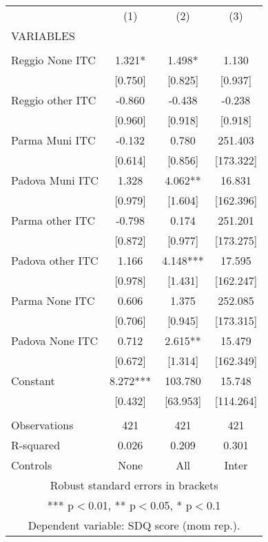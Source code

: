\begin{tabular}{lccc} \hline
 & (1) & (2) & (3) \\
VARIABLES &  &  &  \\ \hline
 &  &  &  \\
Reggio None ITC & 1.321* & 1.498* & 1.130 \\
 & [0.750] & [0.825] & [0.937] \\
Reggio other ITC & -0.860 & -0.438 & -0.238 \\
 & [0.960] & [0.918] & [0.918] \\
Parma Muni ITC & -0.132 & 0.780 & 251.403 \\
 & [0.614] & [0.856] & [173.322] \\
Padova Muni ITC & 1.328 & 4.062** & 16.831 \\
 & [0.979] & [1.604] & [162.396] \\
Parma other ITC & -0.798 & 0.174 & 251.201 \\
 & [0.872] & [0.977] & [173.275] \\
Padova other ITC & 1.166 & 4.148*** & 17.595 \\
 & [0.978] & [1.431] & [162.247] \\
Parma None ITC & 0.606 & 1.375 & 252.085 \\
 & [0.706] & [0.945] & [173.315] \\
Padova None ITC & 0.712 & 2.615** & 15.479 \\
 & [0.672] & [1.314] & [162.349] \\
Constant & 8.272*** & 103.780 & 15.748 \\
 & [0.432] & [63.953] & [114.264] \\
 &  &  &  \\
Observations & 421 & 421 & 421 \\
R-squared & 0.026 & 0.209 & 0.301 \\
 Controls & None & All & Inter \\ \hline
\multicolumn{4}{c}{ Robust standard errors in brackets} \\
\multicolumn{4}{c}{ *** p$<$0.01, ** p$<$0.05, * p$<$0.1} \\
\multicolumn{4}{c}{ Dependent variable: SDQ score (mom rep.).} \\
\end{tabular}

